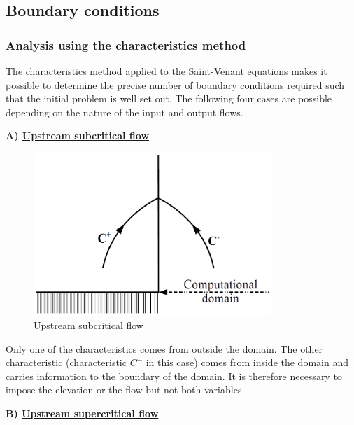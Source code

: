 \subsection{Boundary conditions}
\label{PriseCL}

\subsubsection{Analysis using the characteristics method}

The characteristics method applied to the Saint-Venant equations makes it possible to determine the precise number of boundary conditions required such that the initial problem is well set out. The following four cases are possible depending on the nature of the input and output flows.

\textbf{A) \underline{Upstream subcritical flow}}

\begin{figure}[H]
 \begin{center}
  \includegraphics[width=0.8\textwidth]{Figures/AmontFluvial.png}
  \caption{Upstream subcritical flow}
 \end{center}
\end{figure}

Only one of the characteristics comes from outside the domain. The other characteristic (characteristic $C^-$ in this case) comes from inside the domain and carries information to the boundary of the domain. It is therefore necessary to impose the elevation or the flow but not both variables.

\textbf{B) \underline{Upstream supercritical flow}}

